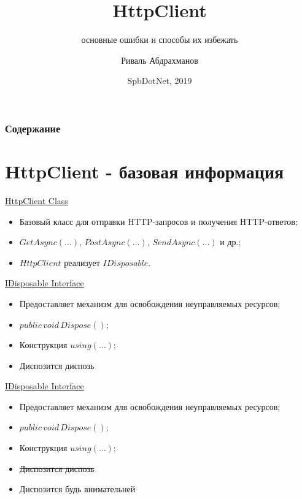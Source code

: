 \documentclass[17pt,aspectratio=169]{beamer}
\title{HttpClient}
\subtitle{основные ошибки и способы их избежать}
\author{Риваль Абдрахманов}
\institute[PT]{Positive Technologies}
\date{SpbDotNet, 2019}
\begin{document}
\begin{frame}
\titlepage
\end{frame}

\begin{frame}
\frametitle{Содержание}
\tableofcontents
\end{frame}

\section{HttpClient - базовая информация}

\begin{frame}{\href{https://docs.microsoft.com/en-us/dotnet/api/system.net.http.httpclient?view=netcore-2.2}{HttpClient Class}}
    \begin{itemize}
        \item <1-> Базовый класс для отправки HTTP-запросов и получения HTTP-ответов;
        \item <2-> $GetAsync(\ldots)$, $PostAsync(\ldots)$, $SendAsync(\ldots)$ и др.;
        \item <3-> $HttpClient$ реализует $IDisposable$.
    \end{itemize}
\end{frame}

\begin{frame}{\href{https://docs.microsoft.com/en-us/dotnet/api/system.idisposable?view=netcore-2.2}{IDisposable Interface}}
    \begin{itemize}
        \item <1-> Предоставляет механизм для освобождения неуправляемых ресурсов;
        \item <2-> $public\,void\,Dispose()$;
        \item <3-> Конструкция $using(\ldots)$;
        \item <4-> Диспозится\,\textrightarrow \,диспозь
    \end{itemize}
\end{frame}

\begin{frame}{\href{https://docs.microsoft.com/en-us/dotnet/api/system.idisposable?view=netcore-2.2}{IDisposable Interface}}
    \begin{itemize}
        \item Предоставляет механизм для освобождения неуправляемых ресурсов;
        \item $public\,void\,Dispose()$;
        \item Конструкция $using(\ldots)$;
        \item \sout{Диспозится\,\textrightarrow \,диспозь}
        \item Диспозится\,\textrightarrow \,будь внимательней
    \end{itemize}
\end{frame}
\end{document}
